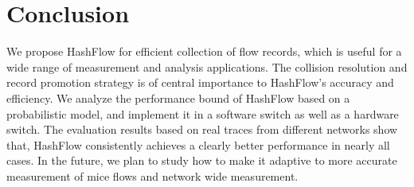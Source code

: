 \section{Conclusion}
\label{section:conclusion}
We propose HashFlow for efficient collection of flow records, 
which is useful for a wide range of measurement and analysis applications. 
The collision resolution and record promotion strategy is of central importance 
to HashFlow's accuracy and efficiency. We analyze the performance bound 
of HashFlow based on a probabilistic model, and implement it in a software switch as well as a hardware switch. 
The evaluation results based on real traces from different networks show that, 
HashFlow consistently achieves a clearly better performance in nearly all cases. 
In the future, we plan to study how to make it adaptive to more accurate measurement of mice flows and network wide measurement.
